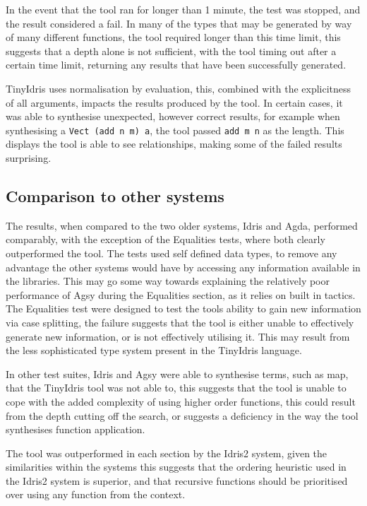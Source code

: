 \documentclass[a4paper]{article}
\begin{document}
In the event that the tool ran for longer than 1 minute, the
test was stopped, and the result considered a fail. In many of
the types that may be generated by way of many different
functions, the tool required longer than this time limit, this suggests
that a depth alone is not sufficient, with the tool timing out after
a certain time limit, returning any results that have been successfully
generated. 

TinyIdris uses normalisation by evaluation, this, combined with the
explicitness of all arguments, impacts the results
produced by the tool. In certain cases, it was able to synthesise
unexpected, however correct results, for example when synthesising a
\texttt{Vect (add n m) a}, the tool passed \texttt{add m n} as the
length. This displays the tool is able to see relationships, making
some of the failed results surprising.

\subsection{Comparison to other systems}
\label{sec:orga2f8b7e}
The results, when compared to the two older systems, Idris and Agda, 
performed comparably, with the exception of the Equalities tests,
where both clearly outperformed the tool. The tests used self defined
data types, to remove any advantage the other systems would have by
accessing any information available in the libraries. This may go some
way towards explaining the relatively poor performance of Agsy during
the Equalities section, as it relies on built in tactics.
The Equalities test were designed to test the
tools ability to gain new information via case splitting, the failure
suggests that the tool is either unable to effectively generate new
information, or is not effectively utilising it. This may result from
the less sophisticated type system present in the TinyIdris language.

In other test suites, Idris and Agsy were able to synthesise terms,
such as map, that the TinyIdris tool was not able to, this suggests
that the tool is unable to cope with the added complexity of using
higher order functions, this could result from the depth cutting off
the search, or suggests a deficiency in the way the tool synthesises
function application.

The tool was outperformed in each section by the Idris2 system,
given the similarities within the systems this suggests that the
ordering heuristic used in the Idris2 system is superior, and that
recursive functions should be prioritised over using any function
from the context.
\end{document}
